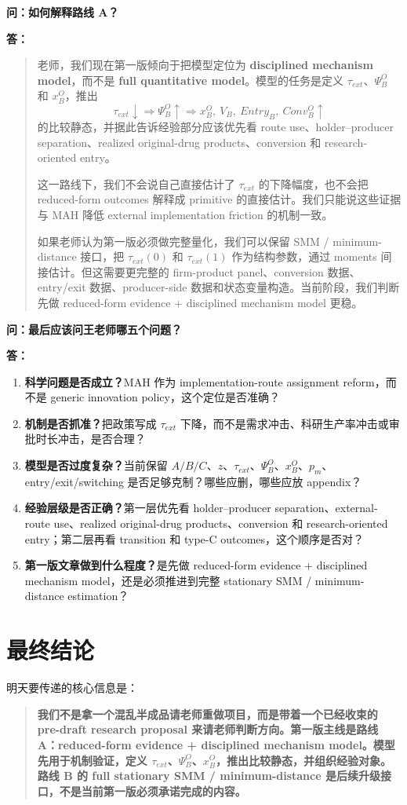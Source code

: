 \documentclass[10pt]{ctexart}
\newcommand{\qtitle}[1]{\vspace{0.35em}\noindent\textbf{问：#1}\par\vspace{0.15em}\noindent\textbf{答：}}
\newcommand{\key}[1]{\textbf{#1}}
\begin{document}
\qtitle{如何解释路线 A？}
\begin{quote}
老师，我们现在第一版倾向于把模型定位为 \textbf{disciplined mechanism model}，而不是 \textbf{full quantitative model}。模型的任务是定义 \(\tau_{ext}\)、\(\Psi_B^O\) 和 \(x_B^O\)，推出
\[
\tau_{ext}\downarrow
\Rightarrow
\Psi_B^O\uparrow
\Rightarrow
x_B^O,\ V_B,\ Entry_B,\ Conv_B^O\uparrow
\]
的比较静态，并据此告诉经验部分应该优先看 route use、holder--producer separation、realized original-drug products、conversion 和 research-oriented entry。

这一路线下，我们不会说自己直接估计了 \(\tau_{ext}\) 的下降幅度，也不会把 reduced-form outcomes 解释成 primitive 的直接估计。我们只能说这些证据与 MAH 降低 external implementation friction 的机制一致。

如果老师认为第一版必须做完整量化，我们可以保留 SMM / minimum-distance 接口，把 \(\tau_{ext}(0)\) 和 \(\tau_{ext}(1)\) 作为结构参数，通过 moments 间接估计。但这需要更完整的 firm-product panel、conversion 数据、entry/exit 数据、producer-side 数据和状态变量构造。当前阶段，我们判断先做 reduced-form evidence + disciplined mechanism model 更稳。
\end{quote}

\qtitle{最后应该问王老师哪五个问题？}
\begin{enumerate}
    \item \key{科学问题是否成立？}MAH 作为 implementation-route assignment reform，而不是 generic innovation policy，这个定位是否准确？
    \item \key{机制是否抓准？}把政策写成 \(\tau_{ext}\) 下降，而不是需求冲击、科研生产率冲击或审批时长冲击，是否合理？
    \item \key{模型是否过度复杂？}当前保留 \(A/B/C\)、\(z\)、\(\tau_{ext}\)、\(\Psi_B^O\)、\(x_B^O\)、\(p_m\)、entry/exit/switching 是否足够克制？哪些应删，哪些应放 appendix？
    \item \key{经验层级是否正确？}第一层优先看 holder--producer separation、external-route use、realized original-drug products、conversion 和 research-oriented entry；第二层再看 transition 和 type-C outcomes，这个顺序是否对？
    \item \key{第一版文章做到什么程度？}是先做 reduced-form evidence + disciplined mechanism model，还是必须推进到完整 stationary SMM / minimum-distance estimation？
\end{enumerate}

\section{最终结论}

明天要传递的核心信息是：
\begin{quote}
\key{我们不是拿一个混乱半成品请老师重做项目，而是带着一个已经收束的 pre-draft research proposal 来请老师判断方向。第一版主线是路线 A：reduced-form evidence + disciplined mechanism model。模型先用于机制验证，定义 \(\tau_{ext}\)、\(\Psi_B^O\)、\(x_B^O\)，推出比较静态，并组织经验对象。路线 B 的 full stationary SMM / minimum-distance 是后续升级接口，不是当前第一版必须承诺完成的内容。}
\end{quote}
\end{document}
